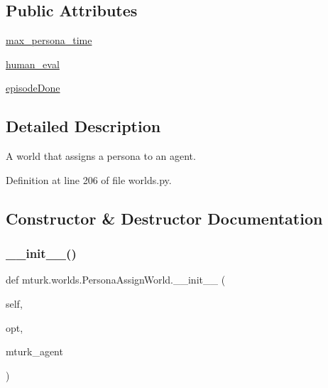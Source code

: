 \subsection*{Public Attributes}
\begin{DoxyCompactItemize}
\item 
\hyperlink{classmturk_1_1worlds_1_1PersonaAssignWorld_a6b4be579df6fa8bba3e97c1246ecd2e6}{max\+\_\+persona\+\_\+time}
\item 
\hyperlink{classmturk_1_1worlds_1_1PersonaAssignWorld_a6ddf796983a5b338818ab09ab10826d4}{human\+\_\+eval}
\item 
\hyperlink{classmturk_1_1worlds_1_1PersonaAssignWorld_ac91ff381948c6316afe395baea1fa5ae}{episode\+Done}
\end{DoxyCompactItemize}


\subsection{Detailed Description}
\begin{DoxyVerb}A world that assigns a persona to an agent.\end{DoxyVerb}
 

Definition at line 206 of file worlds.\+py.



\subsection{Constructor \& Destructor Documentation}
\mbox{\label{classmturk_1_1worlds_1_1PersonaAssignWorld_a88d153ec1fe746dd60d45a1bc925ce71}} 
\subsubsection{\texorpdfstring{\+\_\+\+\_\+init\+\_\+\+\_\+()}{\_\_init\_\_()}}
{\footnotesize\ttfamily def mturk.\+worlds.\+Persona\+Assign\+World.\+\_\+\+\_\+init\+\_\+\+\_\+ (\begin{DoxyParamCaption}\item[{}]{self,  }\item[{}]{opt,  }\item[{}]{mturk\+\_\+agent }\end{DoxyParamCaption})}



